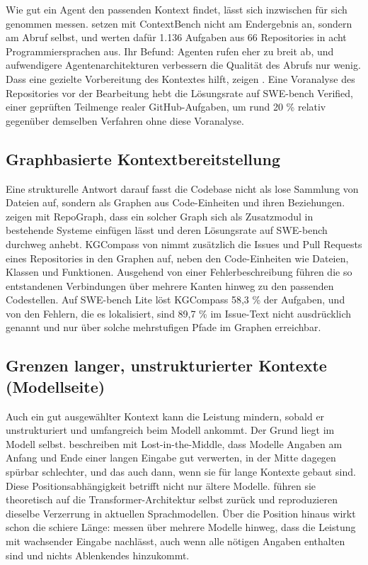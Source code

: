 Wie gut ein Agent den passenden Kontext findet, lässt sich inzwischen für sich genommen messen. \textcite{li2026contextbench} setzen mit ContextBench nicht am Endergebnis an, sondern am Abruf selbst, und werten dafür 1.136 Aufgaben aus 66 Repositories in acht Programmiersprachen aus. Ihr Befund: Agenten rufen eher zu breit ab, und aufwendigere Agentenarchitekturen verbessern die Qualität des Abrufs nur wenig. Dass eine gezielte Vorbereitung des Kontextes hilft, zeigen \textcite{suri2026codescout}. Eine Voranalyse des Repositories vor der Bearbeitung hebt die Lösungsrate auf SWE-bench Verified, einer geprüften Teilmenge realer GitHub-Aufgaben, um rund 20 \% relativ gegenüber demselben Verfahren ohne diese Voranalyse.

\subsection{Graphbasierte Kontextbereitstellung}
\label{subsec:graphbasiert}

Eine strukturelle Antwort darauf fasst die Codebase nicht als lose Sammlung von Dateien auf, sondern als Graphen aus Code-Einheiten und ihren Beziehungen. \textcite{ouyang2024repograph} zeigen mit RepoGraph, dass ein solcher Graph sich als Zusatzmodul in bestehende Systeme einfügen lässt und deren Lösungsrate auf SWE-bench durchweg anhebt. KGCompass von \textcite{yang2025kgcompass} nimmt zusätzlich die Issues und Pull Requests eines Repositories in den Graphen auf, neben den Code-Einheiten wie Dateien, Klassen und Funktionen. Ausgehend von einer Fehlerbeschreibung führen die so entstandenen Verbindungen über mehrere Kanten hinweg zu den passenden Codestellen. Auf SWE-bench Lite löst KGCompass 58,3 \% der Aufgaben, und von den Fehlern, die es lokalisiert, sind 89,7 \% im Issue-Text nicht ausdrücklich genannt und nur über solche mehrstufigen Pfade im Graphen erreichbar.

\subsection{Grenzen langer, unstrukturierter Kontexte (Modellseite)}
\label{subsec:grenzen}

Auch ein gut ausgewählter Kontext kann die Leistung mindern, sobald er unstrukturiert und umfangreich beim Modell ankommt. Der Grund liegt im Modell selbst. \textcite{liu2023lostmiddle} beschreiben mit Lost-in-the-Middle, dass Modelle Angaben am Anfang und Ende einer langen Eingabe gut verwerten, in der Mitte dagegen spürbar schlechter, und das auch dann, wenn sie für lange Kontexte gebaut sind. Diese Positionsabhängigkeit betrifft nicht nur ältere Modelle. \textcite{wu2025positionbias} führen sie theoretisch auf die Transformer-Architektur selbst zurück und reproduzieren dieselbe Verzerrung in aktuellen Sprachmodellen. Über die Position hinaus wirkt schon die schiere Länge: \textcite{du2025contextlength} messen über mehrere Modelle hinweg, dass die Leistung mit wachsender Eingabe nachlässt, auch wenn alle nötigen Angaben enthalten sind und nichts Ablenkendes hinzukommt.

